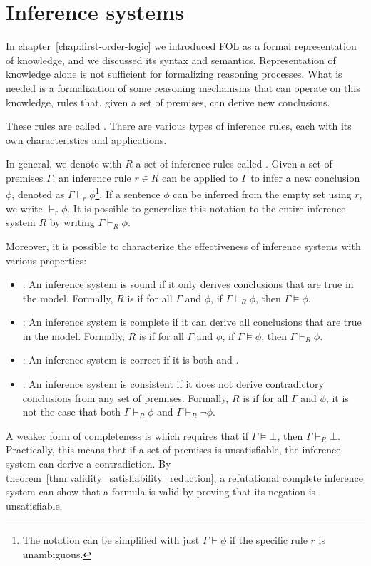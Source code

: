 \chapter{Inference systems}\label{chap:inference-systems}

In chapter~\ref{chap:first-order-logic} we introduced FOL as a formal representation of knowledge, and we discussed its syntax and semantics.
Representation of knowledge alone is not sufficient for formalizing reasoning processes.
What is needed is a formalization of some reasoning mechanisms that can operate on this knowledge, rules that, given a set of premises, can derive new conclusions.

These rules are called .
There are various types of inference rules, each with its own characteristics and applications.

In general, we denote with \(R\) a set of inference rules called . Given a set of premises \(\Gamma\), an inference rule \(r \in R\) can be applied to \(\Gamma\) to infer a new conclusion \(\phi\), denoted as \(\Gamma \vdash_r \phi\)\footnote{
  The notation can be simplified with just \(\Gamma \vdash \phi\) if the specific rule \(r\) is unambiguous.}.
If a sentence \(\phi\) can be inferred from the empty set using \(r\), we write \(\vdash_r \phi\).
It is possible to generalize this notation to the entire inference system \(R\) by writing \(\Gamma \vdash_{R} \phi\).

Moreover, it is possible to characterize the effectiveness of inference systems with various properties:

\begin{itemize}
    \item {}: An inference system is sound if it only derives conclusions that are true in the model. Formally, \(R\) is  if for all \(\Gamma\) and \(\phi\), if \(\Gamma \vdash_{R} \phi\), then \(\Gamma\models\phi\).
    \item {}: An inference system is complete if it can derive all conclusions that are true in the model. Formally, \(R\) is  if for all \(\Gamma\) and \(\phi\), if \(\Gamma\models\phi\), then \(\Gamma \vdash_{R} \phi\).
    \item {}: An inference system is correct if it is both  and .
    \item {}: An inference system is consistent if it does not derive contradictory conclusions from any set of premises. Formally, \(R\) is  if for all \(\Gamma\) and \(\phi\), it is not the case that both \(\Gamma \vdash_{R} \phi\) and \(\Gamma \vdash_{R} \neg \phi\).
\end{itemize}
A weaker form of completeness is  which requires that if \(\Gamma \models \bot\), then \(\Gamma \vdash_{R} \bot\).  Practically, this means that if a set of premises is unsatisfiable, the inference system can derive a contradiction.
By theorem~\ref{thm:validity_satisfiability_reduction}, a refutational complete inference system can show that a formula is valid by proving that its negation is unsatisfiable.

